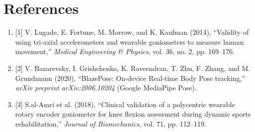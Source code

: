 \documentclass[11pt, a4paper]{article}
\begin{document}
\section{References}
\begin{enumerate}[leftmargin=1.8em, itemsep=0.35em]
    \item {[1]} V. Lugade, E. Fortune, M. Morrow, and K. Kaufman (2014), ``Validity of using tri-axial accelerometers and wearable goniometers to measure human movement,'' \textit{Medical Engineering \& Physics}, vol. 36, no. 2, pp. 169--176.
    \item {[2]} V. Bazarevsky, I. Grishchenko, K. Raveendran, T. Zhu, F. Zhang, and M. Grundmann (2020), ``BlazePose: On-device Real-time Body Pose tracking,'' \textit{arXiv preprint arXiv:2006.10204} (Google MediaPipe Pose).
    \item {[3]} S.al-Amri et al. (2018), ``Clinical validation of a polycentric wearable rotary encoder goniometer for knee flexion assessment during dynamic sports rehabilitation,'' \textit{Journal of Biomechanics}, vol. 71, pp. 112--119.
\end{enumerate}
\end{document}
